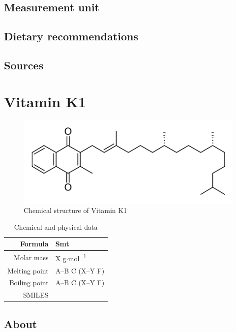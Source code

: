 \documentclass{book}
\begin{document}
\section{Measurement unit}


\section{Dietary recommendations}


\section{Sources}


\chapter{Vitamin K1}
\begin{figure}[h]
	\caption{Chemical structure of Vitamin K1}
	\centering \includegraphics[width=\textwidth]{images/Vitamin_K1_chemical_structure}
\end{figure}

\begin{table}[h]
	\caption{Chemical and physical data}
	\centering \begin{tabular}{| r | l |}
		\hline
		Formula & Smt\\ \hline
		Molar mass & X g$\cdot$mol \textsuperscript{-1}\\ \hline
		Melting point & A--B \degree C (X--Y \degree F)\\ \hline
		Boiling point & A--B \degree C (X--Y \degree F)\\ \hline
		SMILES & \\ \hline
	\end{tabular}
\end{table}
\newpage

\section{About}
\end{document}
